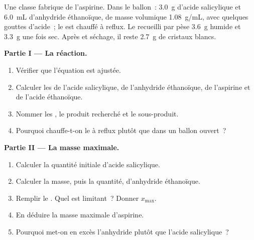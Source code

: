 \begin{problem}
\label{pb:g10:synthesis-yield:1}
Une classe fabrique de l'aspirine. Dans le ballon~: \qty{3.0}{g}
d'acide salicylique et \qty{6.0}{mL} d'anhydride éthanoïque, de masse
volumique \qty{1.08}{g/mL}, avec quelques gouttes d'acide~; le 
est chauffé à reflux. Le  recueilli par 
pèse \qty{3.6}{g} humide et \qty{3.3}{g} une fois sec. Après
 et séchage, il reste \qty{2.7}{g} de cristaux blancs.

\medskip
\noindent\textbf{Partie I --- La réaction.}
\begin{enumerate}
  \item Vérifier que l'équation
         est ajustée.
  \item Calculer les  de l'acide salicylique, de
        l'anhydride éthanoïque, de l'aspirine et de l'acide éthanoïque.
  \item Nommer les , le produit recherché et le sous-produit.
  \item Pourquoi chauffe-t-on le  à reflux plutôt que dans un
        ballon ouvert~?
\end{enumerate}

\medskip
\noindent\textbf{Partie II --- La masse maximale.}
\begin{enumerate}[resume]
  \item Calculer la quantité initiale d'acide salicylique.
  \item Calculer la masse, puis la quantité, d'anhydride éthanoïque.
  \item Remplir le . Quel  est limitant~?
        Donner $x_{\max}$.
  \item En déduire la masse maximale d'aspirine.
  \item Pourquoi met-on en excès l'anhydride plutôt que l'acide
        salicylique~?
\end{enumerate}


\end{problem}
